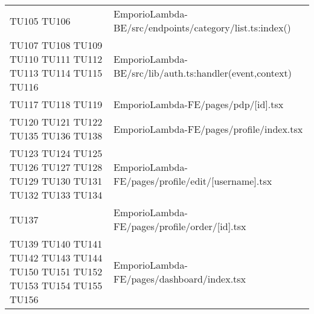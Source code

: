 {\begin{longtable}{C{2cm} C{12.8cm}}
TU105 \newline TU106 & EmporioLambda-BE/src/endpoints/category/list.ts:index()\\

TU107 \newline TU108 \newline TU109 \newline TU110 \newline TU111 \newline TU112 \newline TU113 \newline TU114 \newline TU115 \newline TU116 & EmporioLambda-BE/src/lib/auth.ts:handler(event,context)\\

TU117 \newline TU118 \newline TU119 & EmporioLambda-FE/pages/pdp/[id].tsx\\

TU120 \newline TU121 \newline TU122 \newline TU135 \newline TU136 \newline TU138 & EmporioLambda-FE/pages/profile/index.tsx\\

TU123 \newline TU124 \newline TU125 \newline TU126 \newline TU127 \newline TU128 \newline TU129 \newline TU130 \newline TU131 \newline TU132 \newline TU133 \newline TU134  & EmporioLambda-FE/pages/profile/edit/[username].tsx\\

TU137 & EmporioLambda-FE/pages/profile/order/[id].tsx\\

TU139 \newline TU140 \newline TU141 \newline TU142 \newline TU143 \newline TU144 \newline TU150 \newline TU151 \newline TU152 \newline TU153 \newline TU154 \newline TU155 \newline TU156 & EmporioLambda-FE/pages/dashboard/index.tsx\\


\end{longtable}}
